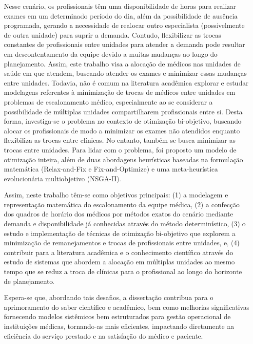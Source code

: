 Nesse cenário, os profissionais têm uma disponibilidade de horas para realizar exames em um determinado período do dia, além da possibilidade de ausência programada, gerando a necessidade de realocar outro especialista (possivelmente de outra unidade) para suprir a demanda. Contudo, flexibilizar as trocas constantes de profissionais entre unidades para atender a demanda pode resultar em descontentamento da equipe devido a muitas mudanças ao longo do planejamento. Assim, este trabalho visa a alocação de médicos nas unidades de saúde em que atendem, buscando atender os exames e minimizar essas mudanças entre unidades. Todavia, não é comum na literatura acadêmica explorar e estudar modelagens referentes à minimização de trocas de médicos entre unidades em problemas de escalonamento médico, especialmente ao se considerar a possibilidade de múltiplas unidades compartilharem profissionais entre si. Desta forma, investiga-se o problema no contexto de otimização bi-objetivo, buscando alocar os profissionais de modo a minimizar os exames não atendidos enquanto flexibiliza as trocas entre clínicas. No entanto, também se busca minimizar as trocas entre unidades. Para lidar com o problema, foi proposto um modelo de otimização inteira, além de duas abordagens heurísticas baseadas na formulação matemática (Relax-and-Fix e Fix-and-Optimize) e uma meta-heurística evolucionária multiobjetivo (NSGA-II).

Assim, neste trabalho têm-se como objetivos principais: (1) a modelagem e representação matemática do escalonamento da equipe médica, (2) a confecção dos quadros de horário dos médicos por métodos exatos do cenário mediante demanda e disponibilidade já conhecidas através do método determinístico, (3) o estudo e implementação de técnicas de otimização bi-objetivo que explorem a minimização de remanejamentos e trocas de profissionais entre unidades, e, (4) contribuir para a literatura acadêmica e o conhecimento científico através do estudo de sistemas que abordem a alocação em múltiplas unidades ao mesmo tempo que se reduz a troca de clínicas para o profissional ao longo do horizonte de planejamento.

Espera-se que, abordando tais desafios, a dissertação contribua para o aprimoramento do saber científico e acadêmico, bem como melhorias significativas fornecendo modelos sistêmicos bem estruturados para gestão operacional de instituições médicas, tornando-as mais eficientes, impactando diretamente na eficiência do serviço prestado e na satisfação do médico e paciente. 

